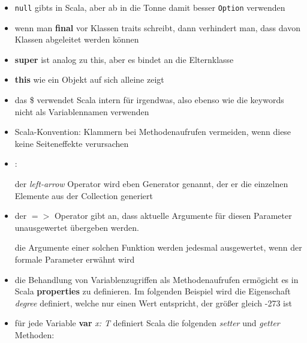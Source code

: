 \begin{itemize}
  \item \texttt{null} gibts in Scala, aber ab in die Tonne damit \und 
  besser \texttt{Option} verwenden
  \item wenn man \textbf{final} vor Klassen \oder traits schreibt, dann
  verhindert man, dass davon Klassen abgeleitet werden können
  \item \textbf{super} ist analog zu this, aber es bindet an die Elternklasse
  \item \textbf{this} wie ein Objekt auf sich alleine zeigt
  \item das \$ verwendet Scala intern für irgendwas, also ebenso wie
  die keywords nicht als Variablennamen verwenden
  \item Scala-Konvention: Klammern bei Methodenaufrufen vermeiden, wenn
  diese keine Seiteneffekte verursachen
  \item {}:
  
  
  
  der \textit{left-arrow} Operator wird eben Generator genannt, der er die
  einzelnen Elemente aus der Collection generiert
  \item der $=>$ Operator gibt an, dass aktuelle Argumente für diesen Parameter
  unausgewertet übergeben werden.
    
  die Argumente einer solchen Funktion werden jedesmal ausgewertet, wenn der
  formale Parameter erwähnt wird
  
    
  \item die Behandlung von Variablenzugriffen als Methodenaufrufen ermögicht
  es in Scala \textbf{properties} zu definieren. Im folgenden Beispiel wird
  die Eigenschaft \textit{degree} definiert, welche nur einen Wert entspricht,
  der größer \oder gleich -273 ist
  
  
  \item für jede Variable \textbf{var} \textit{x: T} definiert Scala
  die folgenden \textit{setter} und \textit{getter} Methoden:
  
  
  

\end{itemize}
